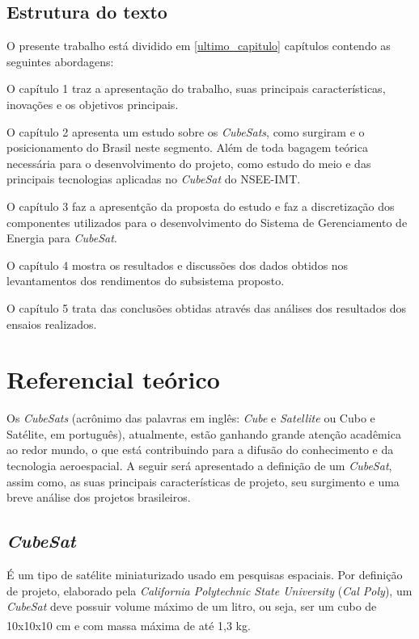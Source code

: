 \documentclass[
	12pt,				%
	openright,			%
	oneside,			%
	a4paper,			%
	english,			%
	french,				%
	spanish,			%
	brazil,				%
	oldfontcommands
	]{abntex2}
\begin{document}
\section[Estrutura do texto]{Estrutura do texto}
	
	O presente trabalho está dividido em \ref{ultimo_capitulo} capítulos contendo as seguintes abordagens:

	O capítulo 1 traz a apresentação do trabalho, suas principais características, inovações e os objetivos principais.

	O capítulo 2 apresenta um estudo sobre os \textit{CubeSats}, como surgiram e o posicionamento do Brasil neste segmento. Além de toda bagagem teórica necessária para o desenvolvimento do projeto, como estudo do meio e das principais tecnologias aplicadas no \textit{CubeSat} do NSEE-IMT.

	O capítulo 3 faz a apresentção da proposta do estudo e faz a discretização dos componentes utilizados para o desenvolvimento do Sistema de Gerenciamento de Energia para \textit{CubeSat}.

	O capítulo 4 mostra os resultados e discussões dos dados obtidos nos levantamentos dos rendimentos do subsistema proposto.
	
	O capítulo 5 trata das conclusões obtidas através das análises dos resultados dos ensaios realizados.


\chapter[Referencial teórico]{Referencial teórico} \label{Cap_Teorico}

	Os \textit{CubeSats} (acrônimo das palavras em inglês: \textit{Cube} e \textit{Satellite} ou Cubo e Satélite, em português), atualmente, estão ganhando grande atenção acadêmica ao redor mundo, o que está contribuindo para a difusão do conhecimento e da tecnologia aeroespacial. A seguir será apresentado a definição de um \textit{CubeSat}, assim como, as suas principais características de projeto, seu surgimento e uma breve análise dos projetos brasileiros. 

\section[CubeSat]{\textit{CubeSat}}

	É um tipo de satélite miniaturizado usado em pesquisas espaciais. Por definição de projeto, elaborado pela \textit{California Polytechnic State University} (\textit{Cal Poly}), um \textit{CubeSat} deve possuir volume máximo de um litro, ou seja, ser um cubo de 10x10x10 cm e com massa máxima de até 1,3 kg.\textsuperscript{\cite{CubeSat}}
	
\end{document}

